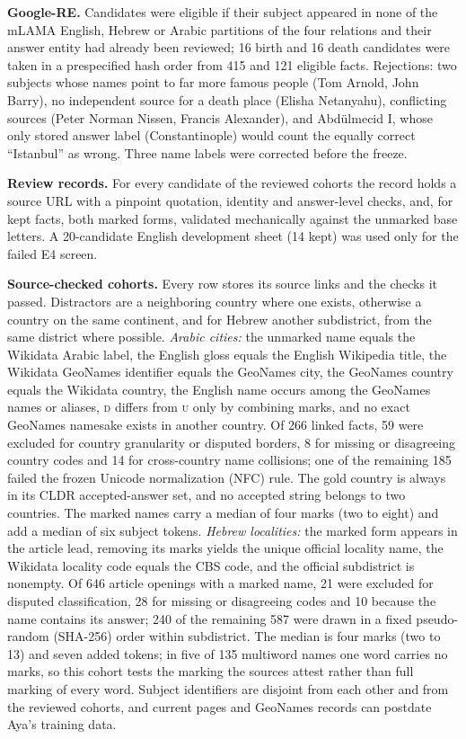 \documentclass[11pt]{article}
\newcommand{\U}{\textsc{u}}
\newcommand{\D}{\textsc{d}}
\begin{document}
\textbf{Google-RE.} Candidates were eligible if their subject appeared in none of
the mLAMA English, Hebrew or Arabic partitions of the four relations and their
answer entity had already been reviewed; 16 birth and 16 death candidates were
taken in a prespecified hash order from 415 and 121 eligible facts. Rejections:
two subjects whose names point to far more famous people (Tom Arnold, John Barry),
no independent source for a death place (Elisha Netanyahu), conflicting sources
(Peter Norman Nissen, Francis Alexander), and Abdülmecid I, whose only stored
answer label (Constantinople) would count the equally correct ``Istanbul'' as
wrong. Three name labels were corrected before the freeze.

\textbf{Review records.} For every candidate of the reviewed cohorts the record
holds a source URL with a pinpoint quotation, identity and answer-level checks,
and, for kept facts, both marked forms, validated mechanically against the
unmarked base letters. A 20-candidate English development sheet (14 kept) was
used only for the failed E4 screen.

\textbf{Source-checked cohorts.} Every row stores its source links and the checks
it passed. Distractors are a neighboring country where one exists, otherwise a
country on the same continent, and for Hebrew another subdistrict, from the same
district where possible. \emph{Arabic cities:} the unmarked name equals the Wikidata Arabic
label, the English gloss equals the English Wikipedia title, the Wikidata
GeoNames identifier equals the GeoNames city, the GeoNames country equals the
Wikidata country, the English name occurs among the GeoNames names or aliases,
\D{} differs from \U{} only by combining marks, and no exact GeoNames namesake
exists in another country. Of 266 linked facts, 59 were excluded for country
granularity or disputed borders, 8 for missing or disagreeing country codes and 14
for cross-country name collisions; one of the remaining 185 failed the frozen
Unicode normalization (NFC) rule. The gold country is always in its CLDR accepted-answer set, and no accepted
string belongs to two countries. The marked names carry a median of four marks
(two to eight) and add a median of six subject tokens. \emph{Hebrew localities:}
the marked form appears in the article lead, removing its marks yields the unique
official locality name, the Wikidata locality code equals the CBS code, and the
official subdistrict is nonempty. Of 646 article openings with a marked name, 21
were excluded for
disputed classification, 28 for missing or disagreeing codes and 10 because the
name contains its answer; 240 of the remaining 587 were drawn in a fixed
pseudo-random (SHA-256) order within subdistrict. The median is four marks (two to 13) and seven added tokens;
in five of 135 multiword names one word carries no marks, so this cohort tests the
marking the sources attest rather than full marking of every word. Subject
identifiers are disjoint from each other and from the reviewed cohorts, and
current pages and GeoNames records can postdate Aya's training data.
\end{document}
